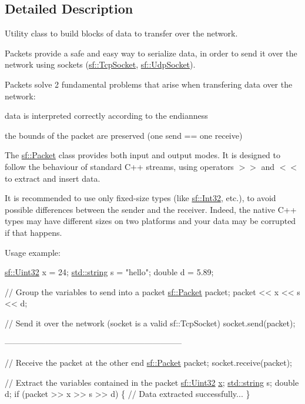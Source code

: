\subsection{Detailed Description}
Utility class to build blocks of data to transfer over the network. 

Packets provide a safe and easy way to serialize data, in order to send it over the network using sockets (\hyperlink{classsf_1_1_tcp_socket}{sf\-::\-Tcp\-Socket}, \hyperlink{classsf_1_1_udp_socket}{sf\-::\-Udp\-Socket}).

Packets solve 2 fundamental problems that arise when transfering data over the network\-: \begin{DoxyItemize}
\item data is interpreted correctly according to the endianness \item the bounds of the packet are preserved (one send == one receive)\end{DoxyItemize}
The \hyperlink{classsf_1_1_packet}{sf\-::\-Packet} class provides both input and output modes. It is designed to follow the behaviour of standard C++ streams, using operators $>$$>$ and $<$$<$ to extract and insert data.

It is recommended to use only fixed-\/size types (like \hyperlink{namespacesf_ac2dfd4952377a26dee4750e2e4a30a15}{sf\-::\-Int32}, etc.), to avoid possible differences between the sender and the receiver. Indeed, the native C++ types may have different sizes on two platforms and your data may be corrupted if that happens.

Usage example\-: 
\begin{DoxyCode}
\hyperlink{namespacesf_aa746fb1ddef4410bddf198ebb27e727c}{sf::Uint32} x = 24;
\hyperlink{gl3_8h_ac83513893df92266f79a515488701770}{std::string} s = \textcolor{stringliteral}{"hello"};
\textcolor{keywordtype}{double} d = 5.89;

\textcolor{comment}{// Group the variables to send into a packet}
\hyperlink{classsf_1_1_packet}{sf::Packet} packet;
packet << x << s << d;

\textcolor{comment}{// Send it over the network (socket is a valid sf::TcpSocket)}
socket.send(packet);

-----------------------------------------------------------------

\textcolor{comment}{// Receive the packet at the other end}
\hyperlink{classsf_1_1_packet}{sf::Packet} packet;
socket.receive(packet);

\textcolor{comment}{// Extract the variables contained in the packet}
\hyperlink{namespacesf_aa746fb1ddef4410bddf198ebb27e727c}{sf::Uint32} \hyperlink{gl3_8h_a92d0386e5c19fb81ea88c9f99644ab1d}{x};
\hyperlink{gl3_8h_ac83513893df92266f79a515488701770}{std::string} s;
\textcolor{keywordtype}{double} d;
\textcolor{keywordflow}{if} (packet >> x >> s >> d)
\{
    \textcolor{comment}{// Data extracted successfully...}
\}
\end{DoxyCode}


